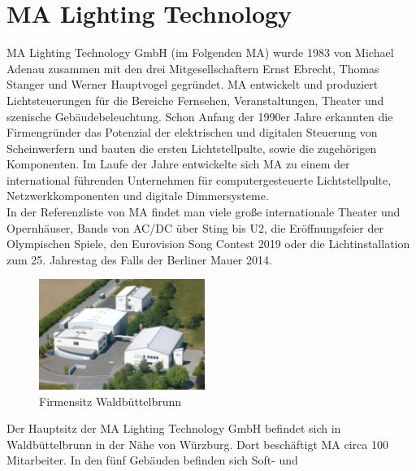 \documentclass[11pt]{scrartcl}
\begin{document}
\section{MA Lighting Technology}
MA Lighting Technology GmbH (im Folgenden MA) wurde 1983 von Michael Adenau zusammen mit
den drei Mitgesellschaftern Ernst Ebrecht, Thomas Stanger und Werner Hauptvogel gegründet. MA
entwickelt und produziert Lichtsteuerungen für die Bereiche Fernsehen, Veranstaltungen, Theater
und szenische Gebäudebeleuchtung. Schon Anfang der 1990er Jahre erkannten die Firmengründer
das Potenzial der elektrischen und digitalen Steuerung von Scheinwerfern und bauten die ersten
Lichtstellpulte, sowie die zugehörigen Komponenten. Im Laufe der Jahre entwickelte sich MA zu
einem der international führenden Unternehmen für computergesteuerte Lichtstellpulte,
Netzwerkkomponenten und digitale Dimmersysteme.\\
In der Referenzliste von MA findet man viele große internationale Theater und Opernhäuser, Bands
von AC/DC über Sting bis U2, die Eröffnungsfeier der Olympischen Spiele, den Eurovision Song
Contest 2019 oder die Lichtinstallation zum 25. Jahrestag des Falls der Berliner Mauer 2014.\\
\begin{figure}
    \vspace{-25pt}
    \begin{center}
        \includegraphics[width=0.48\textwidth]{images/csm_MA_building_WBB.jpg}
    \end{center}
    \vspace{-20pt}
    \captionsetup{justification=raggedright,singlelinecheck=false}
    \caption[Firmensitz Waldbüttelbrunn]{Firmensitz Waldbüttelbrunn \cite{maabout}}
    \vspace{-15pt}
\end{figure}
Der Hauptsitz der MA Lighting Technology GmbH befindet sich in Waldbüttelbrunn in der Nähe von
Würzburg. Dort beschäftigt MA circa 100 Mitarbeiter. In den fünf Gebäuden befinden sich Soft- und
\end{document}
